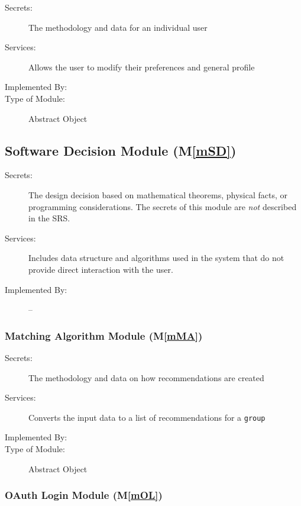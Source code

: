 \documentclass[12pt, titlepage]{article}
\newcommand{\mref}[1]{M\ref{#1}}
\begin{document}
\begin{description}
\item[Secrets:] The methodology and data for an individual user
\item[Services:] Allows the user to modify their preferences and general profile
\item[Implemented By:] \progname
\item[Type of Module:] Abstract Object
\end{description}

\subsection{Software Decision Module (\mref{mSD})}

\begin{description}
\item[Secrets:] The design decision based on mathematical theorems, physical
  facts, or programming considerations. The secrets of this module are
  \emph{not} described in the SRS.
\item[Services:] Includes data structure and algorithms used in the system that
  do not provide direct interaction with the user. 
\item[Implemented By:] --
\end{description}

\subsubsection{Matching Algorithm Module (\mref{mMA})}

\begin{description}
\item[Secrets:] The methodology and data on how recommendations are created
\item[Services:] Converts the input data to a list of recommendations for a \verb_group_
\item[Implemented By:] \progname
\item[Type of Module:] Abstract Object
\end{description}

\subsubsection{OAuth Login Module (\mref{mOL})}
\end{document}
